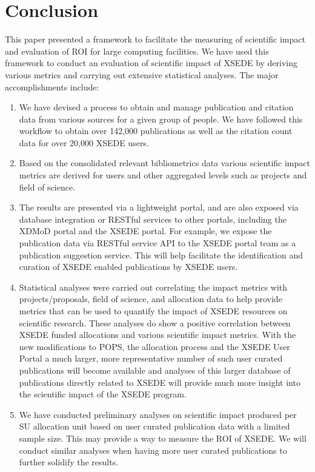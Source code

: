 \documentclass{sig-alternate}
\begin{document}
\section{Conclusion} \label{S:conclusion}

This paper presented a framework to facilitate the measuring of scientific impact and evaluation of ROI for large computing facilities. We have used this framework to conduct an evaluation of scientific impact of XSEDE by deriving various metrics and carrying out extensive statistical analyses. The major accomplishments include:
\begin{enumerate}
\item We have devised a process to obtain and manage publication and citation data from various sources for a given group of people. We have followed this workflow to obtain over 142,000 publications as well as the citation count data for over 20,000 XSEDE users.
\item Based on the consolidated relevant bibliometrics data various scientific impact metrics are derived for users and other aggregated levels such as projects and field of science.
\item The results are presented via a lightweight portal, and are also exposed via database integration or RESTful services to other portals, including the XDMoD portal and the XSEDE portal. For example, we expose the publication data via RESTful service API to the XSEDE portal team as a publication suggestion service. This will help facilitate the identification and curation of XSEDE enabled publications by XSEDE users.
\item Statistical analyses were carried out correlating the impact metrics with projects/proposals, field of science, and allocation data to help provide metrics that can be used to quantify the impact of XSEDE resources on scientific research. These analyses do show a positive correlation between XSEDE funded allocations and various scientific impact metrics. With the new modifications to POPS, the allocation process and the XSEDE User Portal a much larger, more representative number of such user curated publications will become available and analyses of this larger database of publications directly related to XSEDE will provide much more insight into the scientific impact of the XSEDE program.
\item We have conducted preliminary analyses on scientific impact produced per SU allocation unit based on user curated publication data with a limited sample size. This may provide a way to measure the ROI of XSEDE. We will conduct similar analyses when having more user curated publications to further solidify the results.

\end{enumerate} 
\end{document}
